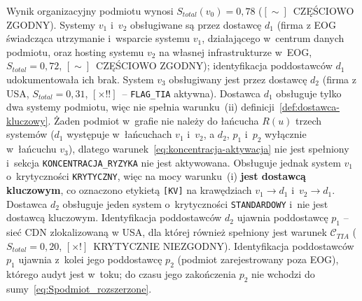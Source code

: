 Wynik organizacyjny podmiotu wynosi $S_{total}(v_0) = 0{,}78$ ($[\sim]$~CZĘŚCIOWO ZGODNY). Systemy $v_1$ i~$v_2$ obsługiwane są przez dostawcę $d_1$ (firma z EOG świadcząca utrzymanie i~wsparcie systemu $v_1$, działającego w~centrum danych podmiotu, oraz hosting systemu $v_2$ na własnej infrastrukturze w~EOG, $S_{total} = 0{,}72$, $[\sim]$~CZĘŚCIOWO ZGODNY); identyfikacja poddostawców $d_1$ udokumentowała ich brak. System $v_3$ obsługiwany jest przez dostawcę $d_2$ (firma z USA, $S_{total} = 0{,}31$, $[\times!!]$~-- \texttt{FLAG\_TIA} aktywna). Dostawca $d_1$ obsługuje tylko dwa systemy podmiotu, więc nie spełnia warunku~(ii) definicji~\ref{def:dostawca-kluczowy}. Żaden podmiot w~grafie nie należy do łańcucha $R(u)$ trzech systemów ($d_1$ występuje w~łańcuchach $v_1$ i~$v_2$, a $d_2$, $p_1$ i~$p_2$ wyłącznie w~łańcuchu $v_3$), dlatego warunek~\eqref{eq:koncentracja-aktywacja} nie jest spełniony i~sekcja \texttt{KONCENTRACJA\_RYZYKA} nie jest aktywowana. Obsługuje jednak system $v_1$ o~krytyczności \texttt{KRYTYCZNY}, więc na mocy warunku~(i) \textbf{jest dostawcą kluczowym}, co oznaczono etykietą \texttt{[KV]} na krawędziach $v_1 \to d_1$ i~$v_2 \to d_1$. Dostawca $d_2$ obsługuje jeden system o~krytyczności \texttt{STANDARDOWY} i~nie jest dostawcą kluczowym. Identyfikacja poddostawców $d_2$ ujawnia poddostawcę $p_1$ -- sieć CDN zlokalizowaną w USA, dla której również spełniony jest warunek $\mathcal{C}_{TIA}$ ($S_{total} = 0{,}20$, $[\times!]$~KRYTYCZNIE NIEZGODNY). Identyfikacja poddostawców $p_1$ ujawnia z~kolei jego poddostawcę $p_2$ (podmiot zarejestrowany poza EOG), którego audyt jest w~toku; do czasu jego zakończenia $p_2$ nie wchodzi do sumy~\eqref{eq:Spodmiot_rozszerzone}.

